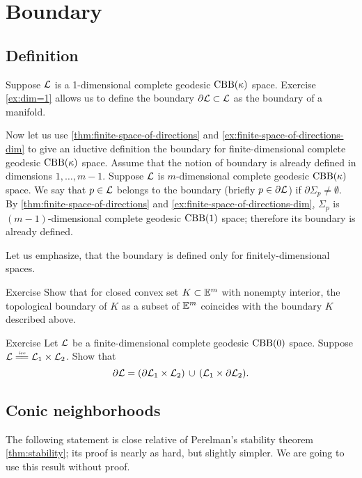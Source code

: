 \chapter{Boundary}\label{chap:bry}

\section{Definition}

Suppose $\mathcal{L}$ is a 1-dimensional complete geodesic $\mathrm{CBB}(\kappa)$ space.
Exercise \ref{ex:dim=1} allows us to define the boundary $\partial\mathcal{L}\subset \mathcal{L}$ as the boundary of a manifold.

Now let us use \ref{thm:finite-space-of-directions} and \ref{ex:finite-space-of-directions-dim} to give an iductive definition the boundary for finite-dimensional complete geodesic $\mathrm{CBB}(\kappa)$ space.
Assume that the notion of boundary is already defined in dimensions $1,\dots,m-1$.
Suppose  $\mathcal{L}$ is $m$-dimensional complete geodesic $\mathrm{CBB}(\kappa)$ space.
We say that $p\in \mathcal{L}$ belongs to the boundary (briefly $p\in \partial \mathcal{L}$) if 
$\partial\Sigma_p\ne\emptyset$.
By \ref{thm:finite-space-of-directions} and \ref{ex:finite-space-of-directions-dim}, $\Sigma_p$ is $(m-1)$-dimensional complete geodesic $\mathrm{CBB}(1)$ space;
therefore its boundary is already defined.

Let us emphasize, that the boundary is defined only for finitely-dimensional spaces.

\begin{thm}{Exercise}\label{ex:bry-convex}
Show that for closed convex set $K\subset \mathbb{E}^m$ with nonempty interior, the topological boundary of $K$ as a subset of $\mathbb{E}^m$ coincides with the boundary $K$ described above.
\end{thm}

\begin{thm}{Exercise}\label{ex:bry-product}
Let $\mathcal{L}$ be a finite-dimensional complete geodesic $\mathrm{CBB}(0)$ space.
Suppose $\spc{L}\iso\spc{L}_1\times\spc{L}_2$.
Show that 
\[\partial \mathcal{L}=(\partial\mathcal{L}_1\times\mathcal{L}_2)\,\cup\,(\mathcal{L}_1\times\partial\mathcal{L}_2).\]
\end{thm}


\section{Conic neighborhoods}


The following statement is close relative of Perelman's stability theorem \ref{thm:stability};
its proof is nearly as hard, but slightly simpler.
We are going to use this result without proof.


